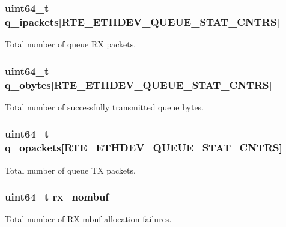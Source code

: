 \subsubsection[{q\+\_\+ipackets}]{\setlength{\rightskip}{0pt plus 5cm}uint64\+\_\+t q\+\_\+ipackets\mbox{[}R\+T\+E\+\_\+\+E\+T\+H\+D\+E\+V\+\_\+\+Q\+U\+E\+U\+E\+\_\+\+S\+T\+A\+T\+\_\+\+C\+N\+T\+R\+S\mbox{]}}\label{structrte__eth__stats_ad9a5051f6330c0125a3d6d7faf0a01bc}
Total number of queue R\+X packets. \hypertarget{structrte__eth__stats_ada241648f7f27179bb65658b9d412618}{}
\subsubsection[{q\+\_\+obytes}]{\setlength{\rightskip}{0pt plus 5cm}uint64\+\_\+t q\+\_\+obytes\mbox{[}R\+T\+E\+\_\+\+E\+T\+H\+D\+E\+V\+\_\+\+Q\+U\+E\+U\+E\+\_\+\+S\+T\+A\+T\+\_\+\+C\+N\+T\+R\+S\mbox{]}}\label{structrte__eth__stats_ada241648f7f27179bb65658b9d412618}
Total number of successfully transmitted queue bytes. \hypertarget{structrte__eth__stats_a948a1e3c16353ae1879d7f76307ce41f}{}
\subsubsection[{q\+\_\+opackets}]{\setlength{\rightskip}{0pt plus 5cm}uint64\+\_\+t q\+\_\+opackets\mbox{[}R\+T\+E\+\_\+\+E\+T\+H\+D\+E\+V\+\_\+\+Q\+U\+E\+U\+E\+\_\+\+S\+T\+A\+T\+\_\+\+C\+N\+T\+R\+S\mbox{]}}\label{structrte__eth__stats_a948a1e3c16353ae1879d7f76307ce41f}
Total number of queue T\+X packets. \hypertarget{structrte__eth__stats_a8afc3f87397701e58b218d9dad03be8c}{}
\subsubsection[{rx\+\_\+nombuf}]{\setlength{\rightskip}{0pt plus 5cm}uint64\+\_\+t rx\+\_\+nombuf}\label{structrte__eth__stats_a8afc3f87397701e58b218d9dad03be8c}
Total number of R\+X mbuf allocation failures. \hypertarget{structrte__eth__stats_ae5db296a3ba987c8543a66d92dc923e1}{}
